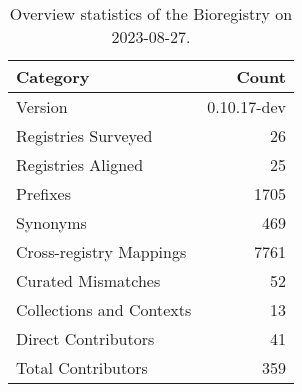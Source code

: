 \begin{table}
\caption{Overview statistics of the Bioregistry on 2023-08-27.}
\label{tab:bioregistry-summary}
\begin{tabular}{lr}
\toprule
Category & Count \\
\midrule
Version & 0.10.17-dev \\
Registries Surveyed & 26 \\
Registries Aligned & 25 \\
Prefixes & 1705 \\
Synonyms & 469 \\
Cross-registry Mappings & 7761 \\
Curated Mismatches & 52 \\
Collections and Contexts & 13 \\
Direct Contributors & 41 \\
Total Contributors & 359 \\
\bottomrule
\end{tabular}
\end{table}
